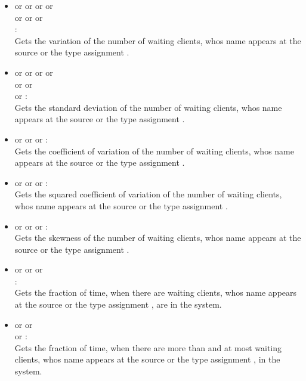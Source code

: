\begin{itemize}
\item
{} or  or  or  or\\
 or  or  or\\
:\\
Gets the variation of the number of waiting clients, whos name appears at the source or the type assignment .

\item
{} or  or  or  or\\
 or  or\\
 or :\\
Gets the standard deviation of the number of waiting clients, whos name appears at the source or the type assignment .

\item
{} or  or  or :\\
Gets the coefficient of variation of the number of waiting clients, whos name appears at the source or the type assignment .

\item
{} or  or  or :\\
Gets the squared coefficient of variation of the number of waiting clients, whos name appears at the source or the type assignment .

\item
{} or  or  or :\\
Gets the skewness of the number of waiting clients, whos name appears at the source or the type assignment .

\item
{} or  or  or\\ :\\
Gets the fraction of time, when there are  waiting clients, whos name appears at the source or the type assignment , are in the system.

\item
{} or  or\\  or :\\
Gets the fraction of time, when there are more than  and at most  waiting clients, whos name appears at the source or the type assignment , in the system.

\end{itemize}





